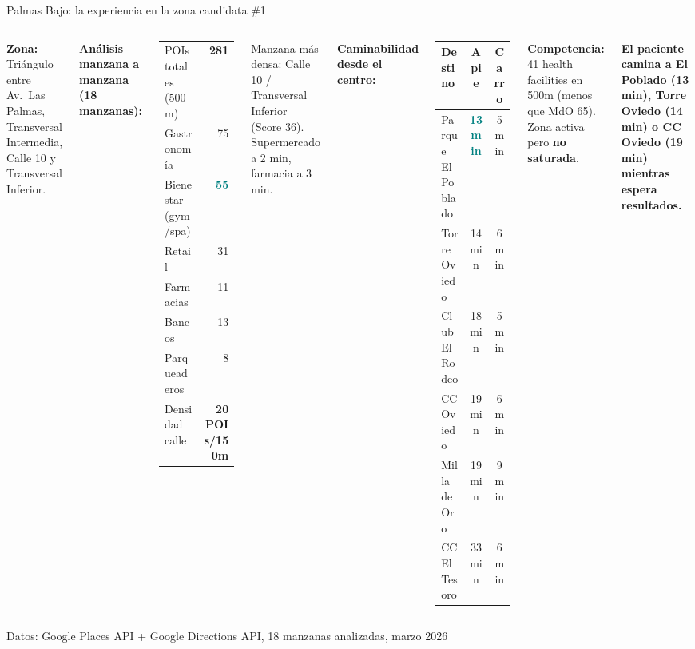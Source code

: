 \documentclass[aspectratio=169, 11pt]{beamer}
\begin{document}
\begin{frame}{Palmas Bajo: la experiencia en la zona candidata \#1}

\begin{columns}[T]
\vspace{2pt}
{\scriptsize\textbf{Zona:} Tri\'{a}ngulo entre Av.\ Las Palmas, Transversal Intermedia, Calle 10 y Transversal Inferior.}

\vspace{3pt}
{\scriptsize\textbf{An\'{a}lisis manzana a manzana (18 manzanas):}}
\vspace{1pt}

{\scriptsize
\begin{tabular}{@{}lr@{}}
\toprule
POIs totales (500m) & \textbf{281} \\
Gastronom\'{i}a & 75 \\
Bienestar (gym/spa) & \textcolor{teal}{\textbf{55}} \\
Retail & 31 \\
Farmacias & 11 \\
Bancos & 13 \\
Parqueaderos & 8 \\
\midrule
Densidad calle & \textbf{20 POIs/150m} \\
\bottomrule
\end{tabular}
}

\vspace{2pt}
{\scriptsize Manzana m\'{a}s densa: Calle 10 / Transversal Inferior (Score 36). Supermercado a 2 min, farmacia a 3 min.}

\vspace{2pt}
{\scriptsize\textbf{Caminabilidad desde el centro:}}
\vspace{1pt}

{\scriptsize
\begin{tabular}{@{}lcc@{}}
\toprule
\textbf{Destino} & \textbf{A pie} & \textbf{Carro} \\
\midrule
Parque El Poblado & \textcolor{teal}{\textbf{13 min}} & 5 min \\
Torre Oviedo & 14 min & 6 min \\
Club El Rodeo & 18 min & 5 min \\
CC Oviedo & 19 min & 6 min \\
Milla de Oro & 19 min & 9 min \\
CC El Tesoro & 33 min & 6 min \\
\bottomrule
\end{tabular}
}

\vspace{3pt}
{\scriptsize\textbf{Competencia:} 41 health facilities en 500m (menos que MdO 65). Zona activa pero \textbf{no saturada}.}

\vspace{3pt}
{\scriptsize\textcolor{hptu}{\textbf{El paciente camina a El Poblado (13 min), Torre Oviedo (14 min) o CC Oviedo (19 min) mientras espera resultados.}}}
\end{columns}

{\tiny\color{slate} Datos: Google Places API + Google Directions API, 18 manzanas analizadas, marzo 2026}
\end{frame}
\end{document}
